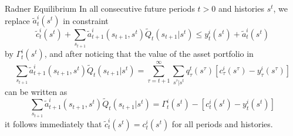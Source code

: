 \documentclass[aspectratio=169,xcolor=dvipsnames]{beamer}
\begin{document}
\begin{frame}{Radner Equilibrium}
    In all consecutive future periods $t > 0$ and histories $s^t$, we replace $\tilde a^i_t(s^t)$ in constraint
    \[
        \tilde c^i_t(s^t) + \sum_{s_{t+1}} \tilde a^i_{t+1}(s_{t+1}, s^t) \tilde Q_t(s_{t+1} | s^t) \le y^i_t(s^t) + \tilde a^i_t(s^t)
    \]
    by $\Gamma^i_t(s^t)$, and after noticing that the value of the asset portfolio in
    \[
        \sum_{s_{t+1}} \tilde a^i_{t+1}(s_{t+1}, s^t) \tilde Q_t(s_{t+1} | s^t) = \sum_{\tau=t+1}^\infty \sum_{s^\tau | s^t} q^t_\tau(s^\tau) [c^i_\tau(s^\tau) - y^i_\tau(s^\tau)]
    \]
    can be written as
    \[
        \sum_{s_{t+1}} \tilde a^i_{t+1}(s_{t+1}, s^t) \tilde Q_t(s_{t+1} | s^t) = \Gamma^i_t(s^t) - [c^i_t(s^t) - y^i_t(s^t)]
    \]
    it follows immediately that $\tilde c^i_t(s^t) = c^i_t(s^t)$ for all periods and histories.
\end{frame}
\end{document}
